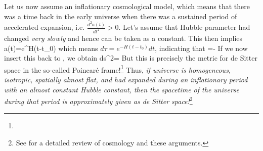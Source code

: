 Let us now assume an inflationary cosmological model, which means that there was a time back in the early universe when there was a sustained period of accelerated expansion, i.e. \mbox{$\frac{d^2a(t)}{dt^2}>0$}. Let's assume that Hubble parameter had changed \emph{very slowly} and hence can be taken as a constant. This then implies
\be 
a(t)=e^{H(t-t_0)}
\ee 
which means $d\tau=e^{-H(t-t_0)}dt$, indicating that
\be 
\tau=-
\ee 
If we now insert this back to , we obtain
\be
\label{eq: dS metric}
ds^2=
\ee 
But this is precisely the metric for de Sitter space in the so-called Poincar\'e frame!\footnote{} Thus, \emph{if universe is homogeneous, isotropic, spatially almost flat, and had expanded during an inflationary period with an almost constant Hubble constant, then the spacetime of the universe during that period is approximately given as de Sitter space!}\footnote{See \cite{Baumann:2018muz} for a detailed review of cosmology and these arguments.}

